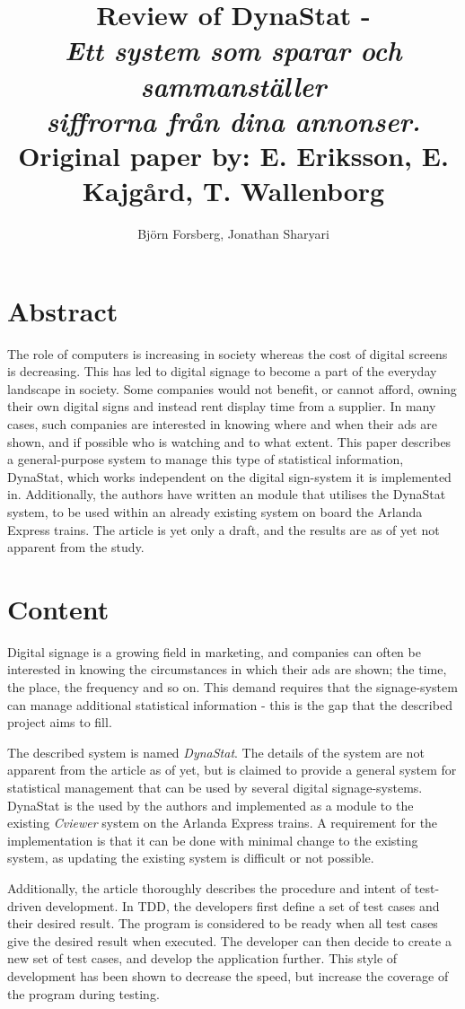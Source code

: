 \documentclass[a4paper,10pt]{article}
\title{Review of DynaStat - \\
	\emph{Ett system som sparar och sammanställer} \\
	\emph{siffrorna från dina annonser.}\\
	\vspace{3mm} \normalsize Original paper by: E. Eriksson, E. Kajgård, T. Wallenborg}
\author{Bj{\"o}rn Forsberg, Jonathan Sharyari}
\begin{document}
\maketitle


\section{Abstract}

The role of computers is increasing in society whereas the cost of digital screens is decreasing. This has led to digital signage to become a part of the everyday landscape in society. Some companies would not benefit, or cannot afford, owning their own digital signs and instead rent display time from a supplier. In many cases, such companies are interested in knowing where and when their ads are shown, and if possible who is watching and to what extent. This paper describes a general-purpose system to manage this type of statistical information, DynaStat, which works independent on the digital sign-system it is implemented in. Additionally, the authors have written an module that utilises the DynaStat system, to be used within an already existing system on board the Arlanda Express trains. The article is yet only a draft, and the results are as of yet not apparent from the study.

\section{Content}
Digital signage is a growing field in marketing, and companies can often be interested in knowing the circumstances in which their ads are shown; the time, the place, the frequency and so on. This demand requires that the signage-system can manage additional statistical information - this is the gap that the described project aims to fill.

The described system is named \emph{DynaStat}. The details of the system are not apparent from the article as of yet, but is claimed to provide a general system for statistical management that can be used by several digital signage-systems. DynaStat is the used by the authors and implemented as a module to the existing \emph{Cviewer} system on the Arlanda Express trains. A requirement for the implementation is that it can be done with minimal change to the existing system, as updating the existing system is difficult or not possible.

Additionally, the article thoroughly describes the procedure and intent of test-driven development. In TDD, the developers first define a set of test cases and their desired result. The program is considered to be ready when all test cases give the desired result when executed. The developer can then decide to create a new set of test cases, and develop the application further. This style of development has been shown to decrease the speed, but increase the coverage of the program during testing.
\end{document}
